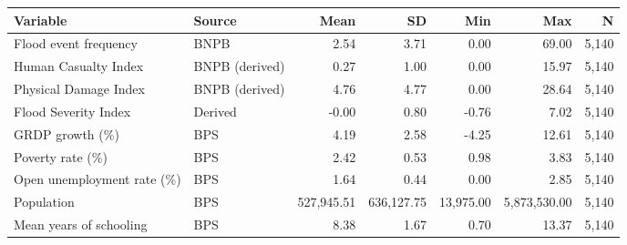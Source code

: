 \begin{tabular*}{\textwidth}{@{\extracolsep{\fill}}llrrrrr@{}}
\toprule
\textbf{Variable} & \textbf{Source} & \textbf{Mean} & \textbf{SD} & \textbf{Min} & \textbf{Max} & \textbf{N} \\
\midrule
Flood event frequency & BNPB & 2.54 & 3.71 & 0.00 & 69.00 & 5,140 \\
Human Casualty Index & BNPB (derived) & 0.27 & 1.00 & 0.00 & 15.97 & 5,140 \\
Physical Damage Index & BNPB (derived) & 4.76 & 4.77 & 0.00 & 28.64 & 5,140 \\
Flood Severity Index & Derived & -0.00 & 0.80 & -0.76 & 7.02 & 5,140 \\
GRDP growth (\%) & BPS & 4.19 & 2.58 & -4.25 & 12.61 & 5,140 \\
Poverty rate (\%) & BPS & 2.42 & 0.53 & 0.98 & 3.83 & 5,140 \\
Open unemployment rate (\%) & BPS & 1.64 & 0.44 & 0.00 & 2.85 & 5,140 \\
Population & BPS & 527,945.51 & 636,127.75 & 13,975.00 & 5,873,530.00 & 5,140 \\
Mean years of schooling & BPS & 8.38 & 1.67 & 0.70 & 13.37 & 5,140 \\
\bottomrule
\end{tabular*}
